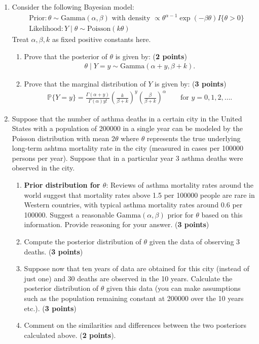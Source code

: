 \documentclass{scrartcl}
\renewcommand{\P}{{\mathbb P}}
\def\qt#1{\qquad\text{#1}}
\begin{document}
\begin{enumerate}
\item Consider the following Bayesian model:
  \begin{align*}
    & \text{Prior}: \theta \sim \text{Gamma}(\alpha, \beta) \text{ with
      density } \propto \theta^{\alpha - 1} \exp(-\beta \theta)
      I\{\theta > 0\} \\
    & \text{Likelihood}: Y \mid \theta \sim \text{Poisson}(k \theta)
  \end{align*}
  Treat $\alpha, \beta, k$ as fixed positive constants here.
  \begin{enumerate}
  \item Prove that the posterior of $\theta$ is given by: (\textbf{2 points})
    \begin{align*}
      \theta \mid Y = y \sim \text{Gamma}(\alpha + y, \beta + k). 
    \end{align*}
  \item Prove that the marginal distribution of $Y$ is given by:
    (\textbf{3 points})
    \begin{align*}
      \P\{Y = y\} = \frac{\Gamma(\alpha + y)}{\Gamma(\alpha) y!}
      \left(\frac{k}{\beta + k} \right)^y \left(\frac{\beta}{\beta +
      k} \right)^{\alpha} \qt{for $y = 0, 1, 2, \dots$}. 
    \end{align*}  
  \end{enumerate}
\item Suppose that the number of asthma deaths in a certain city in
   the United States with a population of 200000 in a single year can
   be modeled by the Poisson distribution with mean $2 \theta$ where
   $\theta$ represents the true underlying long-term ashtma mortality
   rate  in the city (measured in cases per 100000 persons per
   year). Suppose that in a particular year $3$ asthma deaths were
   observed in the city.
   \begin{enumerate}
   \item \textbf{Prior distribution for $\theta$}: Reviews of asthma
     mortality rates around the world suggest that mortality rates
     above 1.5 per 100000 people are rare in Western countries, with
     typical asthma mortality rates around 0.6 per 100000. Suggest a
     reasonable $\text{Gamma}(\alpha, \beta)$ prior for $\theta$ based
     on this information. Provide 
     reasoning for your answer. (\textbf{3 points})
   \item Compute the posterior distribution of $\theta$ given the data
     of observing $3$ deaths. (\textbf{3 points})
   \item Suppose now that ten years of data are obtained for this city
     (instead of just one) and 30 deaths are observed in the 10
     years. Calculate the posterior distribution of $\theta$ given
     this data (you can make assumptions such as the population
     remaining constant at 200000 over the 10 years etc.). (\textbf{3
       points})
   \item Comment on the similarities and differences between the two
     posteriors calculated above. (\textbf{2 points}). 
   \end{enumerate}


\end{enumerate}
\end{document}

